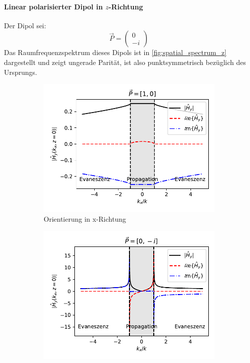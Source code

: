 \documentclass[a4paper, titlepage,  ngerman]{book}
\begin{document}
	\paragraph{Linear polarisierter Dipol in $z$-Richtung}
	Der Dipol sei:
	$$\vec{P} = \begin{pmatrix} 0 \\ -i\end{pmatrix}$$
	Das Raumfrequenzspektrum dieses Dipols ist in \ref{fig:spatial_spectrum_z} dargestellt und zeigt ungerade Parität, ist also punktsymmetrisch bezüglich des Ursprungs.
	\begin{figure}
		\centering
		\label{fig:spatial_spectrum_zx}
		\begin{subfigure}{0.49\textwidth}
			\centering
			\includegraphics[width=\textwidth]{figures/spatial_spectrum_x.pdf}
			\caption{Orientierung in x-Richtung}
			\label{fig:spatial_spectrum_x}
		\end{subfigure}		
		\begin{subfigure}{0.5\textwidth}
			\centering
			\includegraphics[width=\textwidth]{figures/spatial_spectrum_z.pdf}

\end{subfigure}
\end{figure}
\end{document}
